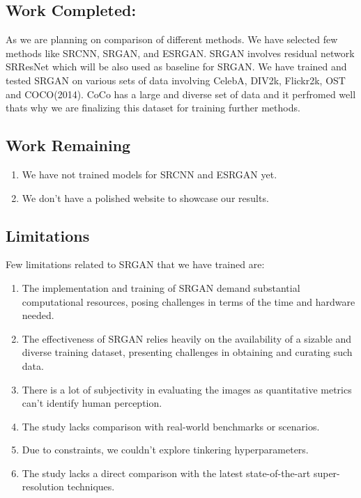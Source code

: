 \clearpage
\newpage
\subsection{Work Completed:}
As we are planning on comparison of different methods. We have selected few methods like SRCNN, SRGAN, and ESRGAN. SRGAN involves residual network SRResNet which will be also used as baseline for SRGAN. We have trained and tested SRGAN on various sets of data involving CelebA, DIV2k, Flickr2k, OST and COCO(2014). CoCo has a large and diverse set of data and it perfromed well thats why we are finalizing this dataset for training further methods. 
\subsection{Work Remaining}
\begin{enumerate}
    \item We have not trained models for SRCNN and ESRGAN yet.
    \item We don't have a polished website to showcase our results.
\end{enumerate}  
\subsection{Limitations}
Few limitations related to SRGAN that we have trained are:
\begin{enumerate}
    \item The implementation and training of SRGAN demand substantial computational resources, posing challenges in terms of the time and hardware needed.
    \item  The effectiveness of SRGAN relies heavily on the availability of a sizable and diverse training dataset, presenting challenges in obtaining and curating such data.
    \item There is a lot of subjectivity in evaluating the images as quantitative metrics can't identify human perception.
    \item  The study lacks comparison with real-world benchmarks or scenarios.
    \item Due to constraints, we couldn't explore tinkering hyperparameters.
    \item The study lacks a direct comparison with the latest state-of-the-art super-resolution techniques.
\end{enumerate}
